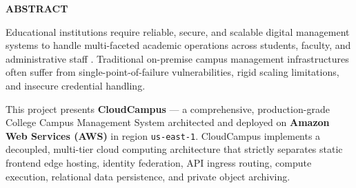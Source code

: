\newpage
\thispagestyle{plain}

\begin{center}
{\LARGE \bfseries \color{primaryblue} ABSTRACT}\\[0.6cm]
\end{center}

\noindent Educational institutions require reliable, secure, and scalable digital management systems to handle multi-faceted academic operations across students, faculty, and administrative staff \cite{iiitdm_kurnool}. Traditional on-premise campus management infrastructures often suffer from single-point-of-failure vulnerabilities, rigid scaling limitations, and insecure credential handling. 

This project presents \textbf{CloudCampus} --- a comprehensive, production-grade College Campus Management System architected and deployed on \textbf{Amazon Web Services (AWS)} in region \texttt{us-east-1}. CloudCampus implements a decoupled, multi-tier cloud computing architecture that strictly separates static frontend edge hosting, identity federation, API ingress routing, compute execution, relational data persistence, and private object archiving.

